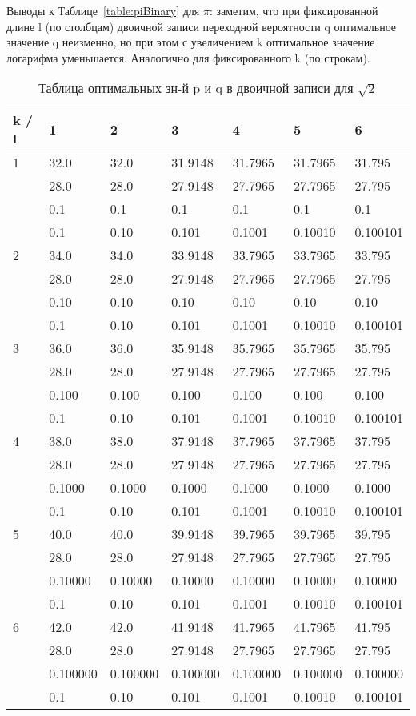 \documentclass[12pt]{article}
\begin{document}
	
	Выводы к Таблице~\ref{table:piBinary} для $\pi$: заметим, что при фиксированной длине l (по столбцам) двоичной записи переходной вероятности q оптимальное значение q неизменно, но при этом с увеличением k оптимальное значение логарифма уменьшается. Аналогично для фиксированного k (по строкам).
	
	\begin{table}[h]
		\caption{Таблица оптимальных зн-й p и q в двоичной записи для $\sqrt{2}$}
		\label{table:2Binary}
		\begin{center}
			\begin{tabular}{|l|l|l|l|l|l|l|}
				\hline
				k / l &1 & 2 & 3 & 4 & 5 & 6\\
				\hline
				1 & 32.0& 32.0& 31.9148& 31.7965& 31.7965& 31.795\\
				& 28.0& 28.0& 27.9148& 27.7965& 27.7965& 27.795\\
				& 0.1& 0.1& 0.1& 0.1& 0.1& 0.1\\
				& 0.1& 0.10& 0.101& 0.1001& 0.10010& 0.100101\\
				\hline
				2 & 34.0& 34.0& 33.9148& 33.7965& 33.7965& 33.795\\
				& 28.0& 28.0& 27.9148& 27.7965& 27.7965& 27.795\\
				& 0.10& 0.10& 0.10& 0.10& 0.10& 0.10\\
				& 0.1& 0.10& 0.101& 0.1001& 0.10010& 0.100101\\
				\hline
				3 & 36.0& 36.0& 35.9148& 35.7965& 35.7965& 35.795\\
				& 28.0& 28.0& 27.9148& 27.7965& 27.7965& 27.795\\
				& 0.100& 0.100& 0.100& 0.100& 0.100& 0.100\\
				& 0.1& 0.10& 0.101& 0.1001& 0.10010& 0.100101\\
				\hline
				4 & 38.0& 38.0& 37.9148& 37.7965& 37.7965& 37.795\\
				& 28.0& 28.0& 27.9148& 27.7965& 27.7965& 27.795\\
				& 0.1000& 0.1000& 0.1000& 0.1000& 0.1000& 0.1000\\
				& 0.1& 0.10& 0.101& 0.1001& 0.10010& 0.100101\\
				\hline
				5 & 40.0& 40.0& 39.9148& 39.7965& 39.7965& 39.795\\
				& 28.0& 28.0& 27.9148& 27.7965& 27.7965& 27.795\\
				& 0.10000& 0.10000& 0.10000& 0.10000& 0.10000& 0.10000\\
				& 0.1& 0.10& 0.101& 0.1001& 0.10010& 0.100101\\
				\hline
				6 & 42.0& 42.0& 41.9148& 41.7965& 41.7965& 41.795\\
				& 28.0& 28.0& 27.9148& 27.7965& 27.7965& 27.795\\
				& 0.100000& 0.100000& 0.100000& 0.100000& 0.100000& 0.100000\\
				& 0.1& 0.10& 0.101& 0.1001& 0.10010& 0.100101\\
				\hline
			\end{tabular}
		\end{center}
	\end{table}
	
\end{document}

